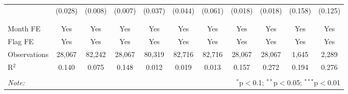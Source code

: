 \begin{table}[!htbp]
\begin{tabular}{@{\extracolsep{1pt}}lcccccccccc}
  & (0.028) & (0.008) & (0.007) & (0.037) & (0.044) & (0.061) & (0.018) & (0.018) & (0.158) & (0.125) \\ 
  & & & & & & & & & & \\ 
\hline \\[-1.8ex] 
Month FE & Yes & Yes & Yes & Yes & Yes & Yes & Yes & Yes & Yes & Yes \\ 
Flag FE & Yes & Yes & Yes & Yes & Yes & Yes & Yes & Yes & Yes & Yes \\ 
Observations & 28,067 & 82,242 & 28,067 & 80,319 & 82,716 & 82,716 & 28,067 & 28,067 & 1,645 & 2,289 \\ 
R$^{2}$ & 0.140 & 0.075 & 0.148 & 0.012 & 0.019 & 0.013 & 0.157 & 0.272 & 0.194 & 0.276 \\ 
\hline 
\hline \\[-1.8ex] 
\textit{Note:}  & \multicolumn{10}{r}{$^{*}$p$<$0.1; $^{**}$p$<$0.05; $^{***}$p$<$0.01} \\ 
\end{tabular} 
\end{table} 
